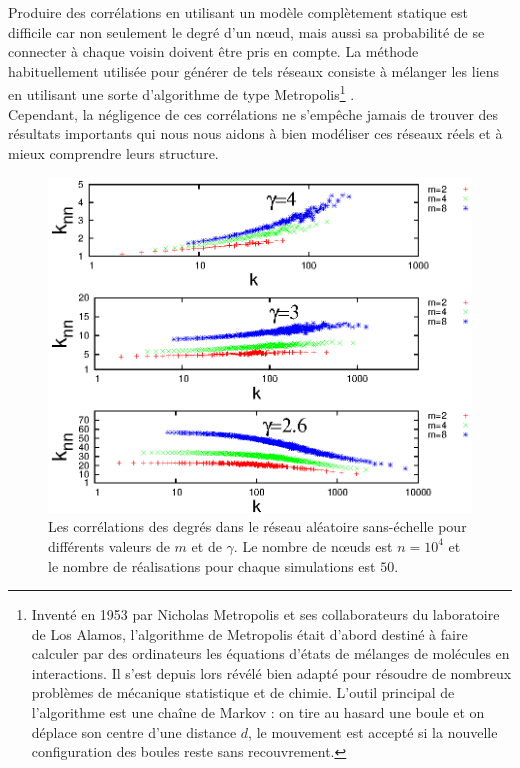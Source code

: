 Produire des corrélations en utilisant un modèle complètement statique est difficile car non seulement le degré d'un nœud, mais aussi sa probabilité de se connecter à chaque voisin doivent être pris en compte. La méthode habituellement utilisée pour générer de tels réseaux consiste à mélanger les liens en utilisant une sorte d'algorithme de type Metropolis\footnote{Inventé en 1953 par Nicholas Metropolis et ses collaborateurs du laboratoire de Los Alamos, l'algorithme de Metropolis était d'abord destiné à faire calculer par des ordinateurs les équations d'états de mélanges de molécules en interactions. Il s'est depuis lors révélé bien adapté pour résoudre de nombreux problèmes de mécanique statistique et de chimie. L'outil principal de l'algorithme est une chaîne de Markov : on tire au hasard une boule et on déplace son centre d'une distance $d$, le mouvement est accepté si la nouvelle configuration des boules reste sans recouvrement.} \cite{Metropolis-al1953}.\\ Cependant, la négligence de ces corrélations ne s'empêche jamais de trouver des résultats importants qui nous nous aidons à bien modéliser ces réseaux réels et à mieux comprendre leurs structure. 
\begin{figure}[h!]
	\centering
	\includegraphics[scale=1.2]{./figures/correlation}
	\caption{Les corrélations des degrés dans le réseau aléatoire sans-échelle pour différents valeurs de $m$ et de $\gamma$. Le nombre de nœuds est $n=10^4$ et le nombre de réalisations pour chaque simulations est $50$.}
	\label{correlation}
\end{figure}
\vspace{3cm}


